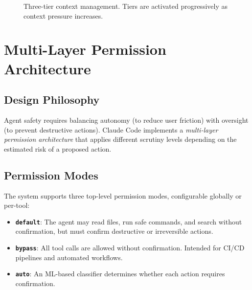 \documentclass{article}
\begin{document}
\begin{figure}[t]
\centering
{}
\caption{Three-tier context management. Tiers are activated progressively as context pressure increases.}
\label{fig:context-mgmt}
\end{figure}

\section{Multi-Layer Permission Architecture}

\subsection{Design Philosophy}

Agent safety requires balancing autonomy (to reduce user friction) with oversight (to prevent destructive actions). Claude Code implements a \emph{multi-layer permission architecture} that applies different scrutiny levels depending on the estimated risk of a proposed action.

\subsection{Permission Modes}

The system supports three top-level permission modes, configurable globally or per-tool:
\begin{itemize}
  \item \textbf{\texttt{default}}: The agent may read files, run safe commands, and search without confirmation, but must confirm destructive or irreversible actions.
  \item \textbf{\texttt{bypass}}: All tool calls are allowed without confirmation. Intended for CI/CD pipelines and automated workflows.
  \item \textbf{\texttt{auto}}: An ML-based classifier determines whether each action requires confirmation.
\end{itemize}
\end{document}
